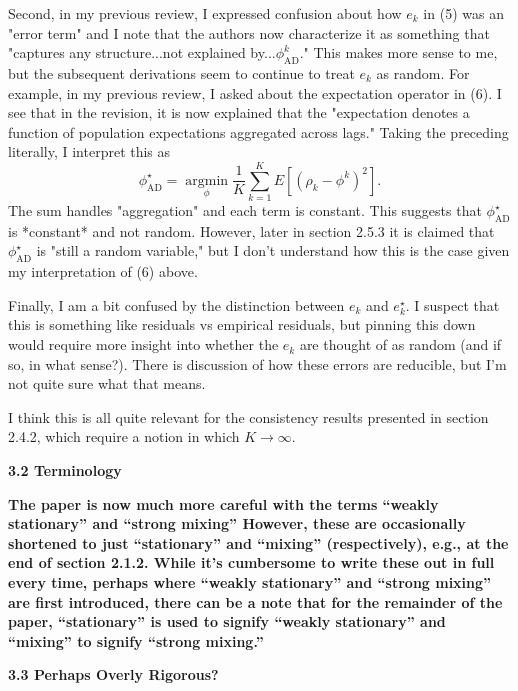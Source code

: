 \documentclass[docs/main.tex]{subfiles}
\newcommand{\reviewercomment}[1]{\vspace{0.3cm}\noindent\textbf{#1}\vspace{0.15cm}}
\begin{document}
 Second, in my previous review, I expressed confusion about how
 \(e_{k}\) in (5) was an "error term" and I note that the authors now
 characterize it as something that "captures any structure...not
 explained by...\(\phi_{\text{AD}}^{k}\)." This makes more sense to me,
 but the subsequent derivations seem to continue to treat \(e_{k}\) as
 random. For example, in my previous review, I asked about the
 expectation operator in (6). I see that in the revision, it is now
 explained that the "expectation denotes a function of population
 expectations aggregated across lags." Taking the preceding literally,
 I interpret this as
 \begin{equation*}
   \phi_{\text{AD}}^{\star} =
   \operatorname*{argmin}_{\phi}
   \frac{1}{K} \sum\limits_{k=1}^K E \left[\left( \rho_{k} - \phi^{k} \right)^2\right].
 \end{equation*}
 The sum handles "aggregation" and each term is constant. This suggests
 that \(\phi_{\text{AD}}^{\star}\) is *constant* and not random.
 However, later in section 2.5.3 it is claimed that
 \(\phi_{\text{AD}}^{\star}\) is "still a random variable," but I don't
 understand how this is the case given my interpretation of (6) above.

 Finally, I am a bit confused by the distinction between \(e_{k}\) and
 \(e_{k}^{\star}\). I suspect that this is something like residuals vs
 empirical residuals, but pinning this down would require more insight
 into whether the \(e_{k}\) are thought of as random (and if so, in
 what sense?). There is discussion of how these errors are reducible,
 but I'm not quite sure what that means.

 I think this is all quite relevant for the consistency results
 presented in section 2.4.2, which require a notion in which \(K \to
 \infty\).

\textbf{3.2 Terminology}

\reviewercomment{The paper is now much more careful with the terms ``weakly stationary'' and ``strong mixing'' However, these are occasionally shortened to just ``stationary'' and ``mixing'' (respectively), e.g., at the end of section 2.1.2. While it's cumbersome to write these out in full every time, perhaps where ``weakly stationary'' and ``strong mixing'' are first introduced, there can be a note that for the remainder of the paper, ``stationary'' is used to signify ``weakly stationary'' and ``mixing'' to signify ``strong mixing.''}

\textbf{3.3 Perhaps Overly Rigorous?}
\end{document}
